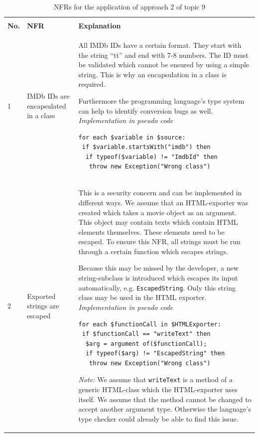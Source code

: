 \begin{longtable}[th]{p{}|p{}|p{}}
	\caption{NFRs for the application of approach 2 of topic 9}
	\label{tbl:topic_9_approach_2_nfr}
	\setlength{\tabcolsep}{1em} \\    %
	\textbf{No.} & \textbf{NFR} & \textbf{Explanation} \\
	\toprule
	1 & IMDb IDs are encapsulated in a class &
	All IMDb IDs have a certain format. They start with the string \enquote{tt} and end with 7-8 numbers. The ID must be validated which cannot be ensured by using a simple string. This is why an encapsulation in a class is required.
	
	Furthermore the programming language's type system can help to identify conversion bugs as well.
	\newline \newline \textit{Implementation in pseudo code}
	\begin{lstlisting}
for each $variable in $source:
 if $variable.startsWith("imdb") then
  if typeof($variable) != "ImdbId" then
   throw new Exception("Wrong class")
	\end{lstlisting}\\
	\midrule
	
	2 & Exported strings are escaped &
	This is a security concern and can be implemented in different ways. We assume that an HTML-exporter was created which takes a movie object as an argument.
	This object may contain texts which contain HTML elements themselves.
	These elements need to be escaped. To ensure this NFR, all strings must be run through a certain function which escapes strings.
	
	Because this may be missed by the developer, a new string-subclass is introduced which escapes its input automatically, e.g. \texttt{EscapedString}.
	Only this string class may be used in the HTML exporter.
	\newline \newline \textit{Implementation in pseudo code}
	
	\begin{lstlisting}
for each $functionCall in $HTMLExporter:
 if $functionCall == "writeText" then
  $arg = argument of($functionCall);
  if typeof($arg) != "EscapedString" then
   throw new Exception("Wrong class")
	\end{lstlisting}

\textit{Note:} We assume that \texttt{writeText} is a method of a generic HTML-class which the HTML-exporter uses itself. We assume that the method cannot be changed to accept another argument type. Otherwise the language's type checker could already be able to find this issue.\\

\bottomrule
\end{longtable}



